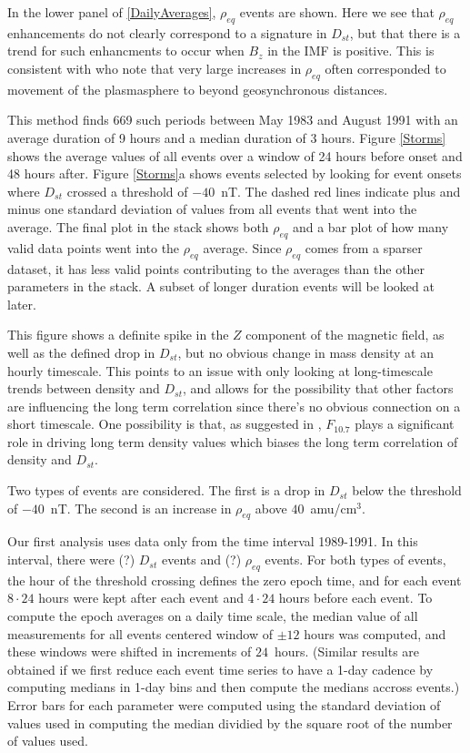 \documentclass[10pt,twocolumn]{article}
\begin{document}
In the lower panel of \ref{DailyAverages}, $\rho_{eq}$ events are shown.  Here we see that $\rho_{eq}$ enhancements do not clearly correspond to a signature in $D_{st}$, but that there is a trend for such enhancments to occur when $B_{z}$ in the IMF is positive.  This is consistent with \cite{Takahashi2010} who note that very large increases in $\rho_{eq}$ often corresponded to movement of the plasmasphere to beyond geosynchronous distances. 

This method finds 669 such periods between May 1983 and August 1991 with an average duration of 9 hours and a median duration of 3 hours. Figure \ref{Storms} shows the average values of all events over a window of 24 hours before onset and 48 hours after. Figure \ref{Storms}a shows events selected by looking for event onsets where $D_{st}$ crossed a threshold of $-40$~nT. The dashed red lines indicate plus and minus one standard deviation of values from all events that went into the average. The final plot in the stack shows both $\rho_{eq}$ and a bar plot of how many valid data points went into the $\rho_{eq}$ average. Since $\rho_{eq}$ comes from a sparser dataset, it has less valid points contributing to the averages than the other parameters in the stack. A subset of longer duration events will be looked at later. 

This figure shows a definite spike in the $Z$ component of the magnetic field, as well as the defined drop in $D_{st}$, but no obvious change in mass density at an hourly timescale. This points to an issue with only looking at long-timescale trends between density and $D_{st}$, and allows for the possibility that other factors are influencing the long term correlation since there's no obvious connection on a short timescale. One possibility is that, as suggested in \cite{Takahashi2010}, $F_{10.7}$ plays a significant role in driving long term density values which biases the long term correlation of density and $D_{st}$.

Two types of events are considered. The first is a drop in $D_{st}$ below the threshold of $-40$~nT.  The second is an increase in $\rho_{eq}$ above $40$~amu/cm$^3$.

Our first analysis uses data only from the time interval 1989-1991.  In this interval, there were (?) $D_{st}$ events and (?) $\rho_{eq}$ events.  For both types of events, the hour of the threshold crossing defines the zero epoch time, and for each event $8\cdot24$ hours were kept after each event and $4\cdot24$ hours before each event.  To compute the epoch averages on a daily time scale, the median value of all measurements for all events centered window of $\pm 12$ hours was computed, and these windows were shifted in increments of $24$~hours. (Similar results are obtained if we first reduce each event time series to have a 1-day cadence by computing medians in 1-day bins and then compute the medians accross events.)  Error bars for each parameter were computed using the standard deviation of values used in computing the median dividied by the square root of the number of values used.
\end{document}
